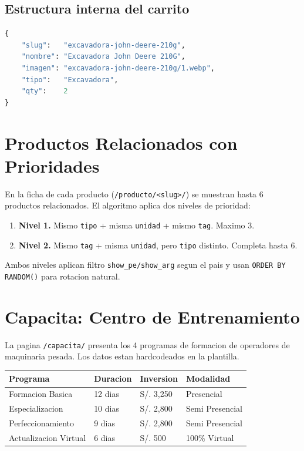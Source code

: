 \documentclass[11pt,a4paper]{article}
\begin{document}
\subsection{Estructura interna del carrito}

\begin{lstlisting}[language=Python]
{
    "slug":   "excavadora-john-deere-210g",
    "nombre": "Excavadora John Deere 210G",
    "imagen": "excavadora-john-deere-210g/1.webp",
    "tipo":   "Excavadora",
    "qty":    2
}
\end{lstlisting}

\section{Productos Relacionados con Prioridades}

En la ficha de cada producto (\texttt{/producto/<slug>/}) se muestran hasta
6 productos relacionados. El algoritmo aplica dos niveles de prioridad:

\begin{enumerate}[leftmargin=*]
    \item \textbf{Nivel 1.} Mismo \texttt{tipo} + misma \texttt{unidad} +
        mismo \texttt{tag}. Maximo 3.
    \item \textbf{Nivel 2.} Mismo \texttt{tag} + misma \texttt{unidad}, pero
        \texttt{tipo} distinto. Completa hasta 6.
\end{enumerate}

Ambos niveles aplican filtro \texttt{show\_pe/show\_arg} segun el pais y
usan \texttt{ORDER BY RANDOM()} para rotacion natural.

\section{Capacita: Centro de Entrenamiento}

La pagina \texttt{/capacita/} presenta los 4 programas de formacion de
operadores de maquinaria pesada. Los datos estan hardcodeados en la
plantilla.

\begin{longtable}{p{4.5cm} p{2.5cm} p{2.5cm} p{4cm}}
\toprule
\textbf{Programa} & \textbf{Duracion} & \textbf{Inversion} & \textbf{Modalidad} \\
\midrule
Formacion Basica         & 12 dias & S/. 3,250 & Presencial \\
Especializacion          & 10 dias & S/. 2,800 & Semi Presencial \\
Perfeccionamiento        & 9 dias  & S/. 2,800 & Semi Presencial \\
Actualizacion Virtual    & 6 dias  & S/. 500   & 100\% Virtual \\
\bottomrule
\end{longtable}
\end{document}
